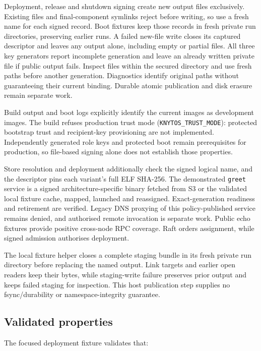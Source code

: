 Deployment, release and shutdown signing create new output files exclusively.
Existing files and final-component symlinks reject before writing, so use a fresh
name for each signed record. Boot fixtures keep those records in fresh private
run directories, preserving earlier runs. A failed new-file write closes its
captured descriptor and leaves any output alone, including empty or partial
files. All three key generators report incomplete generation and leave an
already written private file if public output fails. Inspect files within the
secured directory and use fresh paths before another generation. Diagnostics
identify original paths without guaranteeing their current binding. Durable
atomic publication and disk erasure remain separate work.

Build output and boot logs explicitly identify the current images as
development images. The build refuses production trust mode
(\texttt{KNYTOS\_TRUST\_MODE}): protected bootstrap trust and recipient-key provisioning
are not implemented. Independently generated role keys and protected boot
remain prerequisites for production, so file-based signing alone does not
establish those properties.

Store resolution and deployment additionally check the signed logical name,
and the descriptor pins each variant's full ELF SHA-256. The demonstrated
\texttt{greet} service is a signed architecture-specific binary fetched from
S3 or the validated local fixture cache, mapped, launched and reassigned.
Exact-generation readiness and retirement are verified. Legacy DNS proxying of
this policy-published service remains denied, and authorised remote invocation is
separate work. Public echo fixtures provide positive cross-node RPC coverage.
Raft orders assignment, while signed admission authorises deployment.

The local fixture helper closes a complete staging bundle in its fresh private
run directory before replacing the named output. Link targets and earlier open
readers keep their bytes, while staging-write failure preserves prior output and
keeps failed staging for inspection. This host publication step supplies no
fsync/durability or namespace-integrity guarantee.

\subsection{Validated properties}

The focused deployment fixture validates that:

